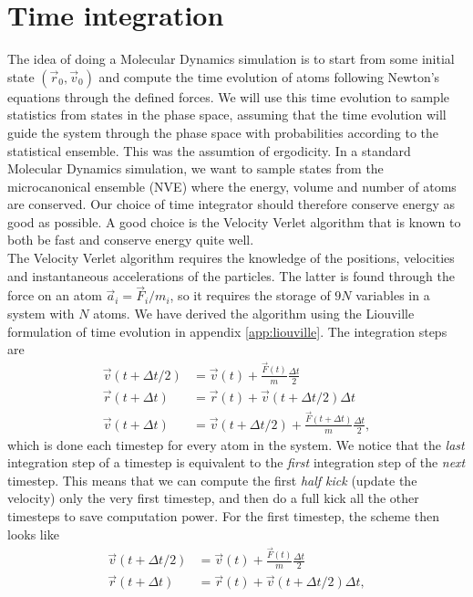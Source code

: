 \section{Time integration}
The idea of doing a Molecular Dynamics simulation is to start from some initial state $(\vec r_0, \vec v_0)$ and compute the time evolution of atoms following Newton's equations through the defined forces. We will use this time evolution to sample statistics from states in the phase space, assuming that the time evolution will guide the system through the phase space with probabilities according to the statistical ensemble. This was the assumtion of ergodicity. In a standard Molecular Dynamics simulation, we want to sample states from the microcanonical ensemble (NVE) where the energy, volume and number of atoms are conserved. Our choice of time integrator should therefore conserve energy as good as possible. A good choice is the Velocity Verlet algorithm that is known to both be fast and conserve energy quite well\cite{frenkel2001understanding}.\\
The Velocity Verlet algorithm requires the knowledge of the positions, velocities and instantaneous accelerations of the particles. The latter is found through the force on an atom $\vec a_i = \vec F_i/m_i$, so it requires the storage of $9N$ variables in a system with $N$ atoms. We have derived the algorithm using the Liouville formulation of time evolution in appendix \ref{app:liouville}. The integration steps are
\begin{align}
	\vec v(t + \Delta t/2) &= \vec v(t) + \frac{\vec F(t)}{m}\frac{\Delta t}{2}\\
	\vec r(t + \Delta t) &= \vec r(t) + \vec v(t + \Delta t/2)\Delta t\\
	\vec v(t + \Delta t) &= \vec v(t + \Delta t/2) + \frac{\vec F(t + \Delta t)}{m}\frac{\Delta t}{2},
\end{align}
which is done each timestep for every atom in the system. We notice that the \textit{last} integration step of a timestep is equivalent to the \textit{first} integration step of the \textit{next} timestep. This means that we can compute the first \textit{half kick} (update the velocity) only the very first timestep, and then do a full kick all the other timesteps to save computation power. For the first timestep, the scheme then looks like
\begin{align}
	\vec v(t + \Delta t/2) &= \vec v(t) + \frac{\vec F(t)}{m}\frac{\Delta t}{2}\\
	\vec r(t + \Delta t) &= \vec r(t) + \vec v(t + \Delta t/2)\Delta t,
\end{align}
